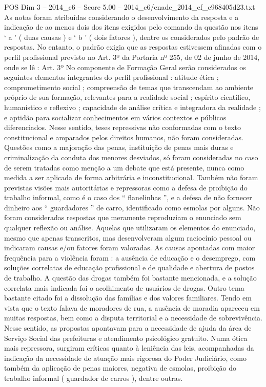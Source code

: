 \begin{textsample}{POS Dim 3 – 2014\_c6 – Score 5.00 – 2014\_c6/enade\_2014\_ef\_e968405d23.txt}
As notas foram atribuídas considerando o desenvolvimento da resposta e a indicação de ao menos dois dos itens exigidos pelo comando da questão nos itens ‘ a ’ ( duas causas ) e ‘ b ’ ( dois fatores ), dentre os considerados pelo padrão de respostas.
No entanto, o padrão exigia que as respostas estivessem afinadas com o perfil profissional previsto no Art. 3º da Portaria nº 255, de 02 de junho de 2014, onde se lê : Art. 3º No componente de Formação Geral serão considerados os seguintes elementos integrantes do perfil profissional : atitude ética ; comprometimento social ; compreensão de temas que transcendam ao ambiente próprio de sua formação, relevantes para a realidade social ; espírito científico, humanístico e reflexivo ; capacidade de análise crítica e integradora da realidade ; e aptidão para socializar conhecimentos em vários contextos e públicos diferenciados.
Nesse sentido, teses repressivas não conformadas com o texto constitucional e amparados pelos direitos humanos, não foram consideradas.
Questões como a majoração das penas, instituição de penas mais duras e criminalização da conduta dos menores desviados, só foram consideradas no caso de serem tratadas como menção a um debate que está presente, nunca como medida a ser aplicada de forma arbitrária e inconstitucional.
Também não foram previstas visões mais autoritárias e repressoras como a defesa de proibição do trabalho informal, como é o caso dos “ flanelinhas ”, e a defesa de não fornecer dinheiro aos “ guardadores ” de carro, identificado como esmolas por alguns.
Não foram consideradas respostas que meramente reproduziam o enunciado sem qualquer reflexão ou análise.
Aquelas que utilizaram os elementos do enunciado, mesmo que apenas transcritos, mas desenvolveram algum raciocínio pessoal ou indicaram causas e/ou fatores foram valoradas.
As causas apontadas com maior frequência para a violência foram : a ausência de educação e o desemprego, com soluções correlatas de educação profissional e de qualidade e abertura de postos de trabalho.
A questão das drogas também foi bastante mencionada, e a solução correlata mais indicada foi o acolhimento de usuários de drogas.
Outro tema bastante citado foi a dissolução das famílias e dos valores familiares.
Tendo em vista que o texto falava de moradores de rua, a ausência de moradia apareceu em muitas respostas, bem como a disputa territorial e a necessidade de sobrevivência.
Nesse sentido, as propostas apontavam para a necessidade de ajuda da área de Serviço Social das prefeituras e atendimento psicológico gratuito.
Numa ótica mais repressora, surgiram críticas quanto à leniência das leis, acompanhadas da indicação da necessidade de atuação mais rigorosa do Poder Judiciário, como também da aplicação de penas maiores, negativa de esmolas, proibição do trabalho informal ( guardador de carros ), dentre outras.

\end{textsample}
